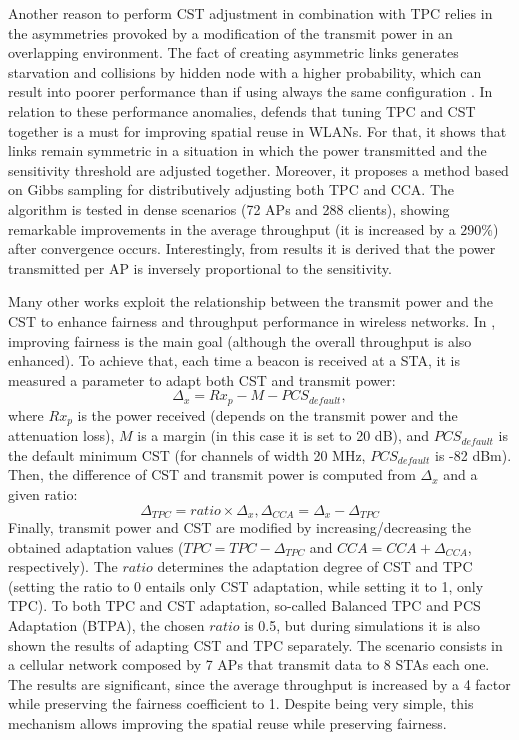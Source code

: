 \documentclass[12pt, a4paper,twoside]{tesi_upf}
\begin{document}
			Another reason to perform CST adjustment in combination with TPC relies in the asymmetries provoked by a modification of the transmit power in an overlapping environment. The fact of creating asymmetric links generates starvation and collisions by hidden node with a higher probability, which can result into poorer performance than if using always the same configuration \cite{kawadia2005principles}. In relation to these performance anomalies, \cite{mhatre2007interference} defends that tuning TPC and CST together is a must for improving spatial reuse in WLANs. For that, it shows that links remain symmetric in a situation in which the power transmitted and the sensitivity threshold are adjusted together. Moreover, it proposes a method based on Gibbs sampling for distributively adjusting both TPC and CCA. The algorithm is tested in dense scenarios (72 APs and 288 clients), showing remarkable improvements in the average throughput (it is increased by a $290\%$) after convergence occurs. Interestingly, from results it is derived that the power transmitted per AP is inversely proportional to the sensitivity.				
			
			Many other works exploit the relationship between the transmit power and the CST to enhance fairness and throughput performance in wireless networks. In \cite{jamil2015preserving}, improving fairness is the main goal (although the overall throughput is also enhanced). To achieve that, each time a beacon is received at a STA, it is measured a parameter to adapt both CST and transmit power: 
			\begin{equation}
				\nonumber
				\Delta_x = Rx_p - M - PCS_{default}, 
			\end{equation}
			where $Rx_p$ is the power received (depends on the transmit power and the attenuation loss), $M$ is a margin (in this case it is set to 20 dB), and $PCS_{default}$ is the default minimum CST (for channels of width 20 MHz, $PCS_{default}$ is -82 dBm). Then, the difference of CST and transmit power is computed from $\Delta_x$ and a given ratio:
			\begin{equation}
				\Delta_{TPC} = ratio \times \Delta_x, \Delta_{CCA} = \Delta_x - \Delta_{TPC}
				\nonumber
			\end{equation}
			Finally, transmit power and CST are modified by increasing/decreasing the obtained adaptation values ($TPC = TPC - \Delta_{TPC}$ and $CCA = CCA + \Delta_{CCA}$, respectively). The $ratio$ determines the adaptation degree of CST and TPC (setting the ratio to 0 entails only CST adaptation, while setting it to 1, only TPC). To both TPC and CST adaptation, so-called Balanced TPC and PCS Adaptation (BTPA), the chosen $ratio$ is 0.5, but during simulations it is also shown the results of adapting CST and TPC separately. The scenario consists in a cellular network composed by 7 APs that transmit data to 8 STAs each one. The results are significant, since the average throughput is increased by a 4 factor while preserving the fairness coefficient to 1. Despite being very simple, this mechanism allows improving the spatial reuse while preserving fairness. 
			
\end{document}
